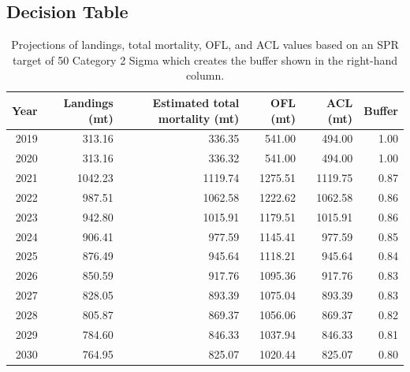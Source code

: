 \documentclass[12pt,]{article}
\begin{document}
\FloatBarrier

\hypertarget{decision-table}{%
\subsection*{Decision Table}\label{decision-table}}

\begin{table}[ht]
\centering
\caption{Projections of landings, total mortality, OFL, and ACL values
              based on an SPR target of 50%
              Category 2 Sigma which creates the buffer shown in the right-hand
              column.} 
\label{tab:OFL_projection}
\begin{tabular}{rrrrrr}
  \hline
Year & Landings (mt) & Estimated total mortality (mt) & OFL (mt) & ACL (mt) & Buffer \\ 
  \hline
2019 & 313.16 & 336.35 & 541.00 & 494.00 & 1.00 \\ 
  2020 & 313.16 & 336.32 & 541.00 & 494.00 & 1.00 \\ 
  2021 & 1042.23 & 1119.74 & 1275.51 & 1119.75 & 0.87 \\ 
  2022 & 987.51 & 1062.58 & 1222.62 & 1062.58 & 0.86 \\ 
  2023 & 942.80 & 1015.91 & 1179.51 & 1015.91 & 0.86 \\ 
  2024 & 906.41 & 977.59 & 1145.41 & 977.59 & 0.85 \\ 
  2025 & 876.49 & 945.64 & 1118.21 & 945.64 & 0.84 \\ 
  2026 & 850.59 & 917.76 & 1095.36 & 917.76 & 0.83 \\ 
  2027 & 828.05 & 893.39 & 1075.04 & 893.39 & 0.83 \\ 
  2028 & 805.87 & 869.37 & 1056.06 & 869.37 & 0.82 \\ 
  2029 & 784.60 & 846.33 & 1037.94 & 846.33 & 0.81 \\ 
  2030 & 764.95 & 825.07 & 1020.44 & 825.07 & 0.80 \\ 
   \hline
\end{tabular}
\end{table}
\end{document}
